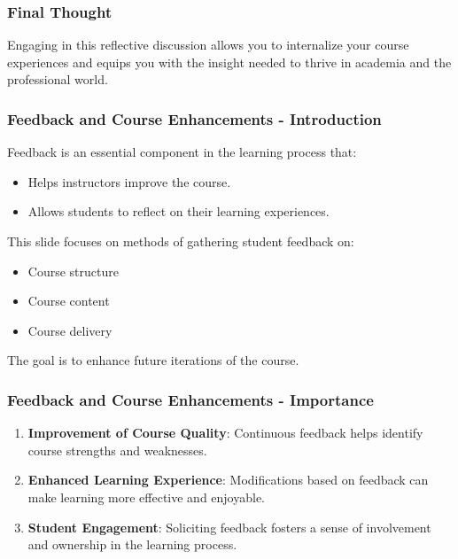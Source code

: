 \documentclass[aspectratio=169]{beamer}
\begin{document}
\begin{frame}[fragile]
    \frametitle{Final Thought}
    Engaging in this reflective discussion allows you to internalize your course experiences and equips you with the insight needed to thrive in academia and the professional world.
\end{frame}

\begin{frame}[fragile]
    \frametitle{Feedback and Course Enhancements - Introduction}
    Feedback is an essential component in the learning process that:
    \begin{itemize}
        \item Helps instructors improve the course.
        \item Allows students to reflect on their learning experiences.
    \end{itemize}
    This slide focuses on methods of gathering student feedback on:
    \begin{itemize}
        \item Course structure
        \item Course content
        \item Course delivery
    \end{itemize}
    The goal is to enhance future iterations of the course.
\end{frame}

\begin{frame}[fragile]
    \frametitle{Feedback and Course Enhancements - Importance}
    \begin{enumerate}
        \item \textbf{Improvement of Course Quality}: Continuous feedback helps identify course strengths and weaknesses.
        \item \textbf{Enhanced Learning Experience}: Modifications based on feedback can make learning more effective and enjoyable.
        \item \textbf{Student Engagement}: Soliciting feedback fosters a sense of involvement and ownership in the learning process.
    \end{enumerate}
\end{frame}
\end{document}
